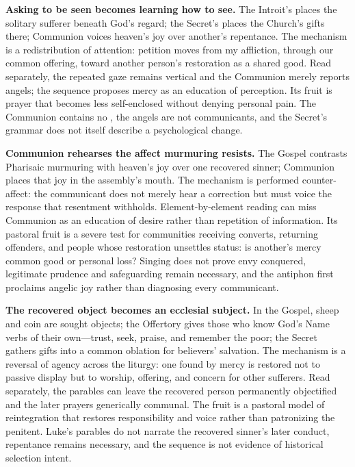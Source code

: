 \begin{deepstudy}
\noindent\textbf{Asking to be seen becomes learning how to see.\enspace{}}
The Introit's  places the solitary sufferer beneath God's regard; the Secret's  places the Church's gifts there; Communion voices heaven's joy over another's repentance. The mechanism is a redistribution of attention: petition moves from my affliction, through our common offering, toward another person's restoration as a shared good. Read separately, the repeated gaze remains vertical and the Communion merely reports angels; the sequence proposes mercy as an education of perception. Its fruit is prayer that becomes less self-enclosed without denying personal pain. The Communion contains no , the angels are not communicants, and the Secret's grammar does not itself describe a psychological change.

\noindent\textbf{Communion rehearses the affect murmuring resists.\enspace{}}
The Gospel contrasts Pharisaic murmuring with heaven's joy over one recovered sinner; Communion places that joy in the assembly's mouth. The mechanism is performed counter-affect: the communicant does not merely hear a correction but must voice the response that resentment withholds. Element-by-element reading can miss Communion as an education of desire rather than repetition of information. Its pastoral fruit is a severe test for communities receiving converts, returning offenders, and people whose restoration unsettles status: is another's mercy common good or personal loss? Singing does not prove envy conquered, legitimate prudence and safeguarding remain necessary, and the antiphon first proclaims angelic joy rather than diagnosing every communicant.

\noindent\textbf{The recovered object becomes an ecclesial subject.\enspace{}}
In the Gospel, sheep and coin are sought objects; the Offertory gives those who know God's Name verbs of their own---trust, seek, praise, and remember the poor; the Secret gathers gifts into a common oblation for believers' salvation. The mechanism is a reversal of agency across the liturgy: one found by mercy is restored not to passive display but to worship, offering, and concern for other sufferers. Read separately, the parables can leave the recovered person permanently objectified and the later prayers generically communal. The fruit is a pastoral model of reintegration that restores responsibility and voice rather than patronizing the penitent. Luke's parables do not narrate the recovered sinner's later conduct, repentance remains necessary, and the sequence is not evidence of historical selection intent.


\end{deepstudy}
